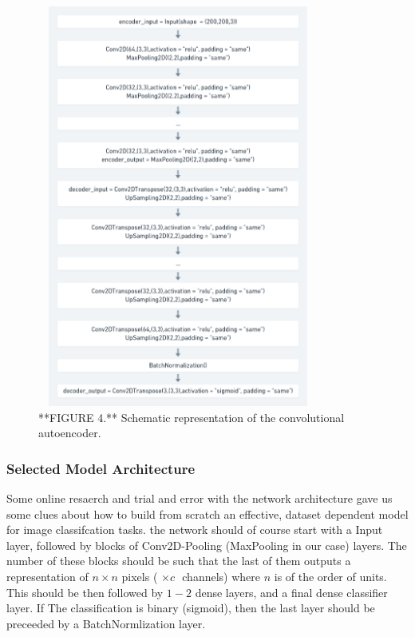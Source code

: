 \documentclass[]{article}
\begin{document}
\begin{figure}

{\centering \includegraphics[width=350px,height=500]{Images/AEShort} 

}

\caption{**FIGURE 4.** Schematic representation of the convolutional autoencoder.}\label{fig:ae}
\end{figure}

\hypertarget{model-arcitecture}{%
\subsubsection{Selected Model Architecture}\label{model-arcitecture}}

Some online resaerch and trial and error with the network architecture
gave us some clues about how to build from scratch an effective, dataset
dependent model for image classifcation tasks. the network should of
course start with a Input layer, followed by blocks of Conv2D-Pooling
(MaxPooling in our case) layers. The number of these blocks should be
such that the last of them outputs a representation of \(n \times n\)
pixels ( \(\times c \, \,\) channels) where \(n\) is of the order of
units. This should be then followed by \(1-2\) dense layers, and a final
dense classifier layer. If The classification is binary (sigmoid), then
the last layer should be preceeded by a BatchNormlization layer.
\end{document}
